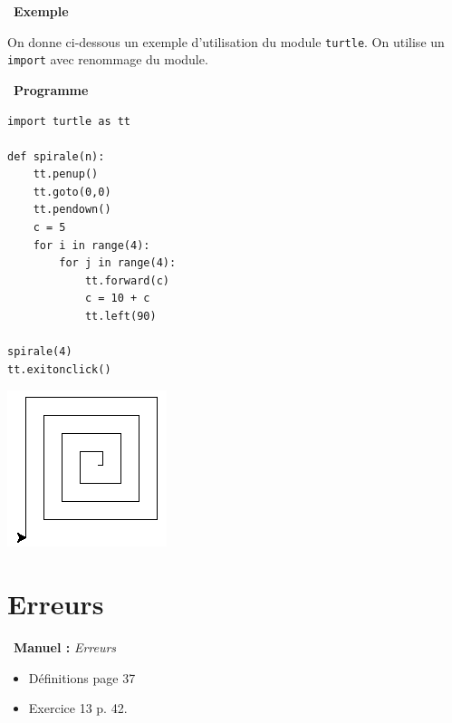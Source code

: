 \documentclass[a4paper, french, 12pt]{article}  %
\newcommand\bcpython{\texttt{[image: /home/fjunier/Maths/python-logo.png]}}
\newcounter{def}
\newcounter{exple}
\newenvironment{exemple}[1]
{\par \medskip   \addtocounter{exple}{1} \noindent  
\begin{bclogo}[arrondi =0.1,   noborder = true, logo=\bclampe, marge=4]{~\textbf{Exemple} \textbf{\theexple} {\itshape #1} }  \par}
{
\end{bclogo}
 \par \bigskip }
\newcounter{prog}
\newenvironment{programme}[1]
{\par \medskip   \addtocounter{prog}{1} \noindent  
 \begin {bclogo}[noborder = true, barre=zigzag,logo=\bcpython, marge=4] {~\textbf{Programme} \textbf{\theprog} {\itshape #1} }  \par  \bigskip}
{
\end{bclogo}
 \par \bigskip }
\newenvironment{manuel}[1]
{\par \medskip  \noindent  
\begin{bclogo}[arrondi =0.1,   noborder = true, logo=\bcoeil, marge=4]{~\textbf{Manuel :}  {\itshape #1} }  \itshape \par}
{
\end{bclogo}
 \par \bigskip }
\begin{document}
\begin{exemple}{}
On donne ci-dessous un exemple d'utilisation du module \texttt{turtle}. On utilise un \texttt{import} avec renommage du module.

\begin{minipage}{0.65\linewidth}

\begin{programme}{}
\begin{lstlisting}[style=rond]
import turtle as tt

def spirale(n):
    tt.penup()
    tt.goto(0,0)
    tt.pendown()
    c = 5
    for i in range(4):
        for j in range(4):
            tt.forward(c)
            c = 10 + c
            tt.left(90)

spirale(4)
tt.exitonclick()
\end{lstlisting}
\end{programme}
\end{minipage}
\hfill
\begin{minipage}{0.3\linewidth}
\begin{center}
\includegraphics[scale=0.6]{ressources/boucle1.png}
\end{center}
\end{minipage}
\end{exemple}


\section{Erreurs}

\begin{manuel}{Erreurs}
\begin{itemize}[label=]
 \item Définitions page 37
 \item Exercice 13 p. 42.
\end{itemize}

\end{manuel}
\end{document}
